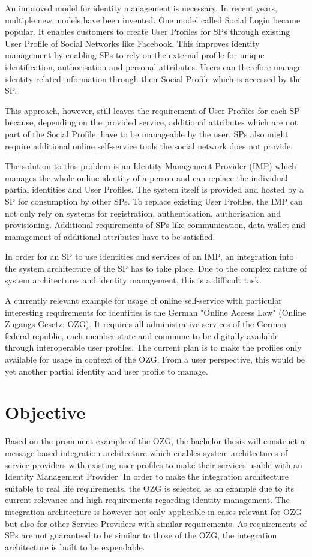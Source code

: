 \documentclass[
     12pt,         %
     a4paper,      %
     BCOR=10mm,version=first,     %
     DIV=14,version=first,        %
     ]{scrreprt}
\begin{document}
An improved model for identity management is necessary. In recent years, multiple new models have been invented. One model called Social Login became popular. It enables customers to create User Profiles for SPs through existing User Profile of Social Networks like Facebook. This improves identity management by enabling SPs to rely on the external profile for unique identification, authorisation and personal attributes. Users can therefore manage identity related information through their Social Profile which is accessed by the SP.

This approach, however, still leaves the requirement of User Profiles for each SP because, depending on the provided service, additional attributes which are not part of the Social Profile, have to be manageable by the user. SPs also might require additional online self-service tools the social network does not provide.

The solution to this problem is an Identity Management Provider (IMP) which manages the whole online identity of a person and can replace the individual partial identities and User Profiles. The system itself is provided and hosted by a SP for consumption by other SPs. To replace existing User Profiles, the IMP can not only rely on systems for registration, authentication, authorisation and provisioning. Additional requirements of SPs like communication, data wallet and management of additional attributes have to be satisfied.

In order for an SP to use identities and services of an IMP, an integration into the system architecture of the SP has to take place. Due to the complex nature of system architectures and identity management, this is a difficult task.

A currently relevant example for usage of online self-service with particular interesting requirements for identities is the German "Online Access Law" (Online Zugangs Gesetz: OZG). It requires all administrative services of the German federal republic, each member state and commune to be digitally available through interoperable user profiles. The current plan is to make the profiles only available for usage in context of the OZG. From a user perspective, this would be yet another partial identity and user profile to manage.

\section{Objective}
Based on the prominent example of the OZG, the bachelor thesis will construct a message based integration architecture which enables system architectures of service providers with existing user profiles to make their services usable with an Identity Management Provider. In order to make the integration architecture suitable to real life requirements, the OZG is selected as an example due to its current relevance and high requirements regarding identity management. The integration architecture is however not only applicable in cases relevant for OZG but also for other Service Providers with similar requirements. As requirements of SPs are not guaranteed to be similar to those of the OZG, the integration architecture is built to be expendable.
\end{document}
